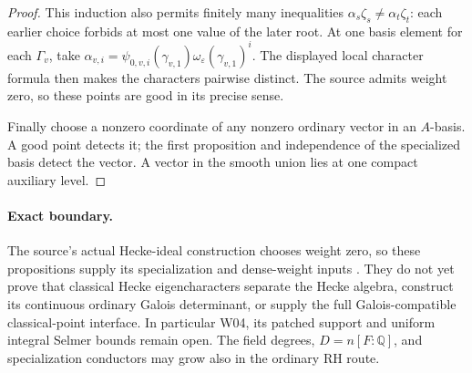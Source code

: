 \begin{proof}
This induction also permits finitely many inequalities
\(\alpha_s\zeta_s\ne\alpha_t\zeta_t\): each earlier choice forbids
at most one value of the later root.  At one basis element for each
\(\Gamma_v\), take
\(\alpha_{v,i}=\psi_{0,v,i}(\gamma_{v,1})
\omega_\varepsilon(\gamma_{v,1})^i\).
The displayed local character formula then makes the characters
pairwise distinct.  The source admits weight zero, so these points
are good in its precise sense.

Finally choose a nonzero coordinate of any nonzero ordinary vector
in an \(A\)-basis.  A good point detects it; the first proposition
and independence of the specialized basis detect the vector.
A vector in the smooth union lies at one compact auxiliary level.
\end{proof}

\paragraph{Exact boundary.}
The source's actual Hecke-ideal construction chooses weight zero,
so these propositions supply its specialization and dense-weight
inputs \cite{SelmerClassicalControlSource}.  They do not yet prove
that classical Hecke eigencharacters separate the Hecke algebra,
construct its continuous ordinary Galois determinant, or supply
the full Galois-compatible classical-point interface.  In
particular W04, its patched support and uniform integral Selmer
bounds remain open.  The field degrees, \(D=n[F:\mathbb Q]\), and
specialization conductors may grow also in the ordinary RH route.
